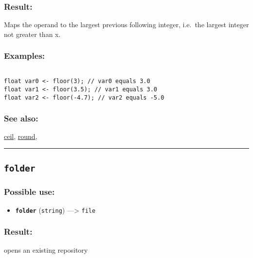 \documentclass[]{book}
\providecommand{\tightlist}{%
  \setlength{\itemsep}{0pt}\setlength{\parskip}{0pt}}
\theoremstyle{definition}
\theoremstyle{definition}
\theoremstyle{definition}
\theoremstyle{remark}
\begin{document}
\subsubsection{Result:}\label{result-165}

Maps the operand to the largest previous following integer, i.e.~the
largest integer not greater than x.

\subsubsection{Examples:}\label{examples-126}

\begin{verbatim}
 
float var0 <- floor(3); // var0 equals 3.0 
float var1 <- floor(3.5); // var1 equals 3.0 
float var2 <- floor(-4.7); // var2 equals -5.0
\end{verbatim}

\subsubsection{See also:}\label{see-also-97}

\href{OperatorsBC\#ceil}{ceil}, \href{OperatorsNR\#round}{round},

\begin{center}\rule{0.5\linewidth}{\linethickness}\end{center}

\subsection{\texorpdfstring{\texttt{folder}}{folder}}\label{folder}

\subsubsection{Possible use:}\label{possible-use-172}

\begin{itemize}
\tightlist
\item
  \textbf{\texttt{folder}} (\texttt{string}) ---\textgreater{}
  \texttt{file}
\end{itemize}

\subsubsection{Result:}\label{result-166}

opens an existing repository
\end{document}
